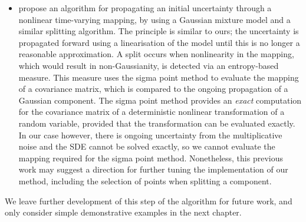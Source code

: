 \begin{itemize}
	\item \citet{DeMarsEtAl_2013_EntropyBasedApproachUncertainty} propose an algorithm for propagating an initial uncertainty through a nonlinear time-varying mapping, by using a Gaussian mixture model and a similar splitting algorithm.
	      The principle is similar to ours; the uncertainty is propagated forward using a linearisation of the model until this is no longer a reasonable approximation.
	      A split occurs when nonlinearity in the mapping, which would result in non-Gaussianity, is detected via an entropy-based measure.
	      This measure uses the sigma point method to evaluate the mapping of a covariance matrix, which is compared to the ongoing propagation of a Gaussian component.
	      The sigma point method provides an \emph{exact} computation for the covariance matrix of a deterministic nonlinear transformation of a random variable, provided that the transformation can be evaluated exactly.
	      In our case however, there is ongoing uncertainty from the multiplicative noise and the SDE cannot be solved exactly, so we cannot evaluate the mapping required for the sigma point method.
	      Nonetheless, this previous work may suggest a direction for further tuning the implementation of our method, including the selection of points when splitting a component.

\end{itemize}
We leave further development of this step of the algorithm for future work, and only consider simple demonstrative examples in the next chapter.





